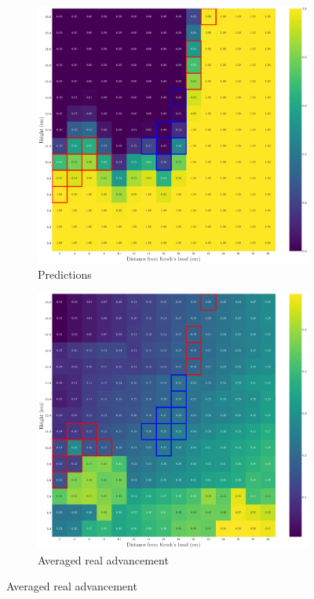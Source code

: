 \documentclass[../document.tex]{subfiles}
\begin{document}
\begin{figure}[htbp]
    \centering
    \begin{subfigure}[b]{0.66\linewidth}
        \includegraphics[width=\linewidth]{../img/5/custom_patches/walls_heights/walls_heights_preds.png}
        \caption{Predictions}
        \label{fig : walls-heights-preds}
    \end{subfigure}   
    \begin{subfigure}[b]{0.66\linewidth}
        \includegraphics[width=\linewidth]{../img/5/custom_patches/walls_heights/walls_heights_advs.png}
        \caption{Averaged real advancement}
        \label{fig : walls-heights-advs}
    \end{subfigure}   
\end{figure}
\end{document}
